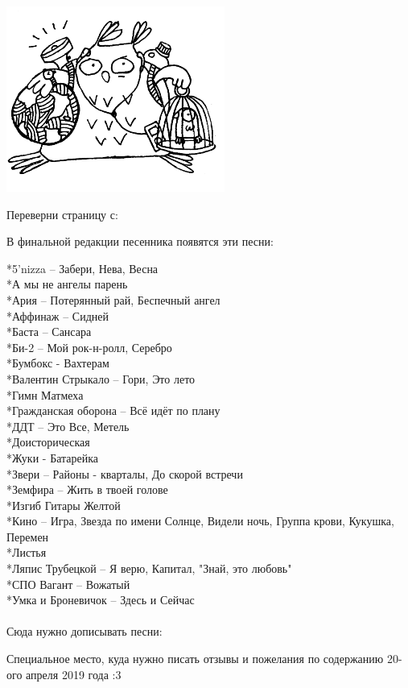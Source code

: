 \documentclass[11pt,a5paper]{book}
\begin{document}
\newpage
\raggedright

\centering\includegraphics[scale=0.5]{11}


Переверни страницу с:

\newpage
\raggedright
В финальной редакции песенника появятся эти песни:\\

 \noindent
 
*5'nizza -- Забери, Нева, Весна\\
*А мы не ангелы парень \\
*Ария -- Потерянный рай, Беспечный ангел\\
*Аффинаж -- Сидней\\
*Баста -- Сансара \\
*Би-2 -- Мой рок-н-ролл, Серебро\\
*Бумбокс - Вахтерам \\
*Валентин Стрыкало -- Гори, Это лето\\
*Гимн Матмеха\\
*Гражданская оборона -- Всё идёт по плану\\
*ДДТ -- Это Все, Метель\\ 
*Доисторическая\\
*Жуки - Батарейка\\
*Звери -- Районы - кварталы, До скорой встречи\\
*Земфира -- Жить в твоей голове\\
*Изгиб Гитары Желтой\\
*Кино -- Игра, Звезда по имени Солнце, Видели ночь, Группа крови, Кукушка, Перемен\\
*Листья\\
*Ляпис Трубецкой -- Я верю, Капитал, "Знай, это любовь"\\
*СПО Вагант -- Вожатый \\ 
*Умка и Броневичок -- Здесь и Сейчас\\
\\
Сюда нужно дописывать песни:\
\newpage
\raggedright
Специальное место, куда нужно писать отзывы и пожелания по содержанию 20-ого апреля 2019 года :3
\end{document}
